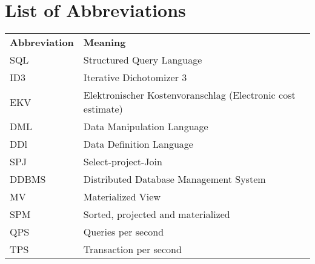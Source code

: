 
% 

\section*{List of Abbreviations}

\noindent %
\begin{minipage}{\textwidth}
\begin{tabular}{ll}
    \textbf{Abbreviation} & \textbf{Meaning} \\
    SQL & Structured Query Language \\
    ID3 & Iterative  Dichotomizer 3 \\
    EKV & Elektronischer Kostenvoranschlag (Electronic cost estimate)\\
    DML & Data Manipulation Language \\
    DDl & Data Definition Language\\
    SPJ & Select-project-Join\\
    DDBMS & Distributed Database Management System \\
    MV & Materialized View\\
    SPM & Sorted, projected and materialized\\
    QPS & Queries per second\\
    TPS & Transaction per second\\
\end{tabular}
\end{minipage}
% 

    